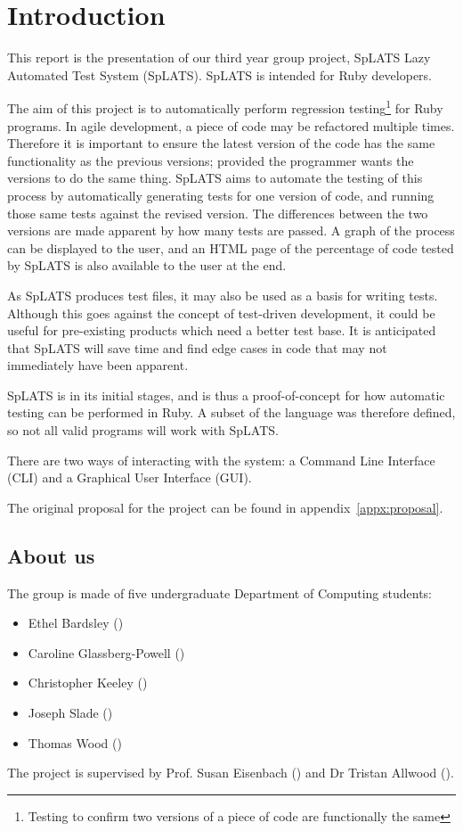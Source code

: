 \chapter{Introduction}

This report is the presentation of our third year group project, SpLATS Lazy Automated Test System (SpLATS). SpLATS is intended for Ruby developers.

The aim of this project is to automatically perform regression testing\footnote{Testing to confirm two versions of a piece of code are functionally the same} for Ruby programs. In agile development, a piece of code may be refactored multiple times. Therefore it is important to ensure the latest version of the code has the same functionality as the previous versions; provided the programmer wants the versions to do the same thing. SpLATS aims to automate the testing of this process by automatically generating tests for one version of code, and running those same tests against the revised version. The differences between the two versions are made apparent by how many tests are passed. A graph of the process can be displayed to the user, and an HTML page of the percentage of code tested by SpLATS is also available to the user at the end.

As SpLATS produces test files, it may also be used as a basis for writing tests. Although this goes against the concept of test-driven development, it could be useful for pre-existing products which need a better test base. It is anticipated that SpLATS will save time and find edge cases in code that may not immediately have been apparent.

SpLATS is in its initial stages, and is thus a proof-of-concept for how automatic testing can be performed in Ruby. A subset of the language was therefore defined, so not all valid programs will work with SpLATS.

There are two ways of interacting with the system: a Command Line Interface (CLI) and a Graphical User Interface (GUI).

The original proposal for the project can be found in appendix~\ref{appx:proposal}.

\section{About us}
  The group is made of five undergraduate Department of Computing students:
  \begin{itemize}
    \item{Ethel Bardsley ()}
    \item{Caroline Glassberg-Powell ()}
    \item{Christopher Keeley ()}
    \item{Joseph Slade ()}
    \item{Thomas Wood ()}
  \end{itemize}

  The project is supervised by Prof. Susan Eisenbach () and Dr Tristan Allwood ().
